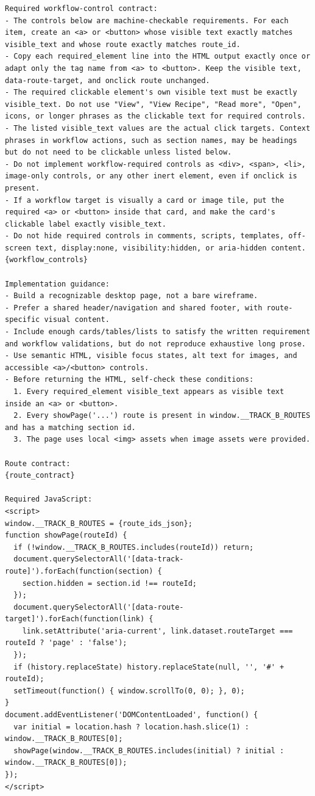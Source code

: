 \begin{verbatim}
Required workflow-control contract:
- The controls below are machine-checkable requirements. For each item, create an <a> or <button> whose visible text exactly matches visible_text and whose route exactly matches route_id.
- Copy each required_element line into the HTML output exactly once or adapt only the tag name from <a> to <button>. Keep the visible text, data-route-target, and onclick route unchanged.
- The required clickable element's own visible text must be exactly visible_text. Do not use "View", "View Recipe", "Read more", "Open", icons, or longer phrases as the clickable text for required controls.
- The listed visible_text values are the actual click targets. Context phrases in workflow actions, such as section names, may be headings but do not need to be clickable unless listed below.
- Do not implement workflow-required controls as <div>, <span>, <li>, image-only controls, or any other inert element, even if onclick is present.
- If a workflow target is visually a card or image tile, put the required <a> or <button> inside that card, and make the card's clickable label exactly visible_text.
- Do not hide required controls in comments, scripts, templates, off-screen text, display:none, visibility:hidden, or aria-hidden content.
{workflow_controls}

Implementation guidance:
- Build a recognizable desktop page, not a bare wireframe.
- Prefer a shared header/navigation and shared footer, with route-specific visual content.
- Include enough cards/tables/lists to satisfy the written requirement and workflow validations, but do not reproduce exhaustive long prose.
- Use semantic HTML, visible focus states, alt text for images, and accessible <a>/<button> controls.
- Before returning the HTML, self-check these conditions:
  1. Every required_element visible_text appears as visible text inside an <a> or <button>.
  2. Every showPage('...') route is present in window.__TRACK_B_ROUTES and has a matching section id.
  3. The page uses local <img> assets when image assets were provided.

Route contract:
{route_contract}

Required JavaScript:
<script>
window.__TRACK_B_ROUTES = {route_ids_json};
function showPage(routeId) {
  if (!window.__TRACK_B_ROUTES.includes(routeId)) return;
  document.querySelectorAll('[data-track-route]').forEach(function(section) {
    section.hidden = section.id !== routeId;
  });
  document.querySelectorAll('[data-route-target]').forEach(function(link) {
    link.setAttribute('aria-current', link.dataset.routeTarget === routeId ? 'page' : 'false');
  });
  if (history.replaceState) history.replaceState(null, '', '#' + routeId);
  setTimeout(function() { window.scrollTo(0, 0); }, 0);
}
document.addEventListener('DOMContentLoaded', function() {
  var initial = location.hash ? location.hash.slice(1) : window.__TRACK_B_ROUTES[0];
  showPage(window.__TRACK_B_ROUTES.includes(initial) ? initial : window.__TRACK_B_ROUTES[0]);
});
</script>


\end{verbatim}
